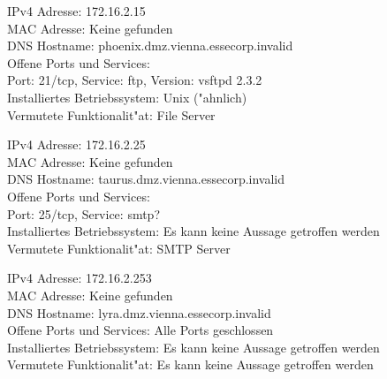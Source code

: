 \documentclass[12pt,a4paper,titlepage,oneside]{scrartcl}
\begin{document}
\begin{description}
\item
IPv4 Adresse: 172.16.2.15\\
MAC Adresse: Keine gefunden\\
DNS Hostname: phoenix.dmz.vienna.essecorp.invalid\\
Offene Ports und Services:\\
Port: 21/tcp, Service: ftp, Version: vsftpd 2.3.2\\
Installiertes Betriebssystem: Unix ("ahnlich)\\
Vermutete Funktionalit"at: File Server\\
\item
IPv4 Adresse: 172.16.2.25\\
MAC Adresse: Keine gefunden\\
DNS Hostname: taurus.dmz.vienna.essecorp.invalid\\
Offene Ports und Services:\\
Port: 25/tcp, Service: smtp?\\
Installiertes Betriebssystem: Es kann keine Aussage getroffen werden\\
Vermutete Funktionalit"at: SMTP Server\\
\item
IPv4 Adresse: 172.16.2.253\\
MAC Adresse: Keine gefunden\\
DNS Hostname: lyra.dmz.vienna.essecorp.invalid\\
Offene Ports und Services: Alle Ports geschlossen\\
Installiertes Betriebssystem: Es kann keine Aussage getroffen werden\\
Vermutete Funktionalit"at: Es kann keine Aussage getroffen werden\\
\end{description}
\end{document}
